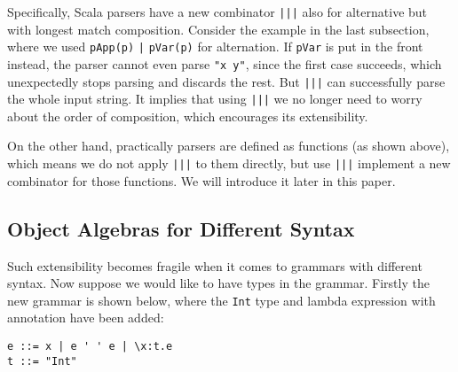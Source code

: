 Specifically, Scala parsers have a new combinator \lstinline{|||} also for alternative but with longest match composition. Consider the example in the last subsection, where we used \lstinline{pApp(p)} \lstinline{|} \lstinline{pVar(p)} for alternation. If \lstinline{pVar} is put in the front instead, the parser cannot even parse \lstinline{"x y"}, since the first case succeeds, which unexpectedly stops parsing and discards the rest. But \lstinline{|||} can successfully parse the whole input string. It implies that using \lstinline{|||} we no longer need to worry about the order of composition, which encourages its extensibility.

On the other hand, practically parsers are defined as functions (as shown above), which means we do not apply \lstinline{|||} to them directly, but use \lstinline{|||} implement a new combinator for those functions. We will introduce it later in this paper.

\subsection{Object Algebras for Different Syntax}\label{subsec:differentsyntax}

Such extensibility becomes fragile when it comes to grammars with different syntax. Now suppose we would like to have types in the grammar. Firstly the new grammar is shown below, where the \lstinline{Int} type and lambda expression with annotation have been added:
\begin{lstlisting}
e ::= x | e ' ' e | \x:t.e
t ::= "Int"
\end{lstlisting}

